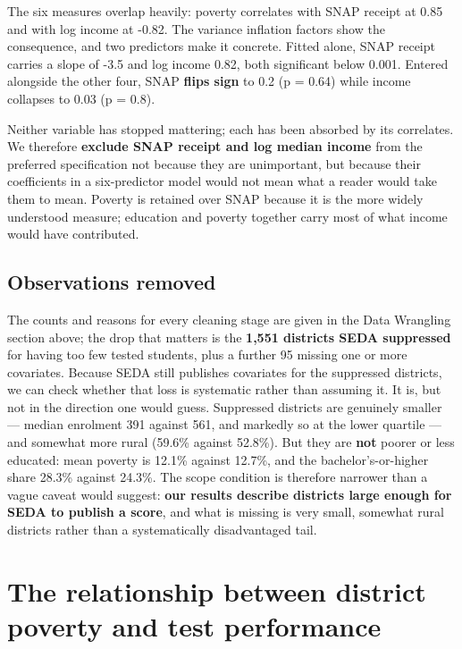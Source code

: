 \documentclass[
]{article}
\begin{document}
The six measures overlap heavily: poverty correlates with SNAP receipt
at 0.85 and with log income at -0.82. The variance inflation factors
show the consequence, and two predictors make it concrete. Fitted alone,
SNAP receipt carries a slope of -3.5 and log income 0.82, both
significant below 0.001. Entered alongside the other four, SNAP
\textbf{flips sign} to 0.2 (p = 0.64) while income collapses to 0.03 (p
= 0.8).

Neither variable has stopped mattering; each has been absorbed by its
correlates. We therefore \textbf{exclude SNAP receipt and log median
income} from the preferred specification not because they are
unimportant, but because their coefficients in a six-predictor model
would not mean what a reader would take them to mean. Poverty is
retained over SNAP because it is the more widely understood measure;
education and poverty together carry most of what income would have
contributed.

\subsection{Observations removed}\label{observations-removed}

The counts and reasons for every cleaning stage are given in the Data
Wrangling section above; the drop that matters is the \textbf{1,551
districts SEDA suppressed} for having too few tested students, plus a
further 95 missing one or more covariates. Because SEDA still publishes
covariates for the suppressed districts, we can check whether that loss
is systematic rather than assuming it. It is, but not in the direction
one would guess. Suppressed districts are genuinely smaller --- median
enrolment 391 against 561, and markedly so at the lower quartile --- and
somewhat more rural (59.6\% against 52.8\%). But they are \textbf{not}
poorer or less educated: mean poverty is 12.1\% against 12.7\%, and the
bachelor's-or-higher share 28.3\% against 24.3\%. The scope condition is
therefore narrower than a vague caveat would suggest: \textbf{our
results describe districts large enough for SEDA to publish a score},
and what is missing is very small, somewhat rural districts rather than
a systematically disadvantaged tail.

\section{The relationship between district poverty and test
performance}\label{the-relationship-between-district-poverty-and-test-performance}
\end{document}
